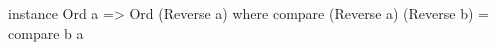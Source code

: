 \begin{code}
instance Ord a => Ord (Reverse a) where
  compare (Reverse a) (Reverse b) = compare b a
\end{code}

